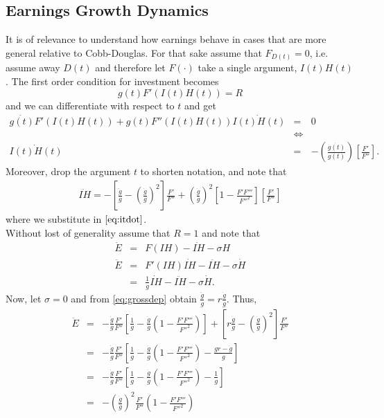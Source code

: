 \subsection{Earnings Growth Dynamics} \label{section:egdyn}
It is of relevance to understand how earnings behave in cases that are more general relative to Cobb-Douglas. For that sake assume that $F_{D(t)} = 0 $, i.e. assume away $D(t)$ and therefore let $F(\cdot)$ take a single argument, $I(t) H(t)$. The first order condition for investment becomes
\begin{equation}
g(t) F'(I(t) H(t)) = R
\end{equation}
and we can differentiate with respect to $t$ and get
\begin{eqnarray}
\dot{g(t)} F'(I(t) H(t)) + g(t) F''(I(t) H(t)) \dot{I(t) H(t)} &=& 0 \nonumber \\
&\Leftrightarrow& \nonumber \\
\dot{I(t) H(t)} &=& - \left( \frac{\dot{g(t)}}{g(t)} \right) \left[ \frac{F'}{F''}\right] \label{eq:itdot}.
\end{eqnarray}
\noindent Moreover, drop the argument $t$ to shorten notation, and note that
\begin{eqnarray}
\ddot{IH} = - \left[ \frac{\ddot{g}}{g} - \left( \frac{\dot{g}}{g} \right)^2 \right] \frac{F'}{F''} + \left( \frac{\dot{g}}{g} \right)^2 \left[ 1 - \frac{F'F'''}{{F''}^2} \right] \left[ \frac{F'}{F''} \right]  
\end{eqnarray}  
where we substitute in $\eqref{eq:itdot}$.\\
\indent Without lost of generality assume that $R = 1$ and note that
\begin{eqnarray}
\dot{E} &=& F(IH) - \dot{IH} - \sigma H \nonumber \\
\ddot{E} &=& F'(IH) \dot{IH} - \ddot{IH} - \sigma \dot{H} \nonumber \\
&=& \frac{1}{g} \dot{IH} - \ddot{IH} - \sigma \dot{H}.
\end{eqnarray}
Now, let $\sigma = 0$ and from \eqref{eq:grossdep} obtain $\frac{\ddot{g}}{g} = r \frac{\dot{g}}{g}$. Thus,
\begin{eqnarray}
\ddot{E} &=& - \frac{\dot{g}}{g} \frac{F'}{F''} \left[ \frac{1}{g} - \frac{\dot{g}}{g} \left( 1 - \frac{F'F'''}{{F''}^2} \right) \right] + \left[ r \frac{\dot{g}}{g} - \left( \frac{\dot{g}}{g} \right)^2 \right] \frac{F'}{F''} \nonumber \\
&=& - \frac{\dot{g}}{g} \frac{F'}{F''} \left[ \frac{1}{g} - \frac{\dot{g}}{g} \left( 1 - \frac{F'F'''}{{F''}^2} \right) - \frac{gr - \dot{g}}{g} \right] \nonumber \\
&=& - \frac{\dot{g}}{g} \frac{F'}{F''} \left[ \frac{1}{g} - \frac{\dot{g}}{g} \left( 1 - \frac{F'F'''}{{F''}^2} \right) - \frac{1}{g} \right] \nonumber \\
&=& - \left( \frac{\dot{g}}{g} \right)^2 \frac{F'}{F''} \left( 1 - \frac{F'F'''}{{F''}^2} \right)
\end{eqnarray}

